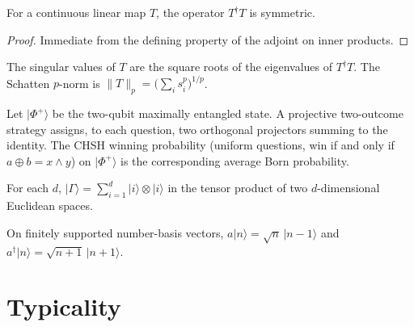 \begin{lemma}
  \label{lem:isSymmetric_adjoint_comp_self}
  \leanok
  For a continuous linear map $T$, the operator $T^\dagger T$ is symmetric.
\end{lemma}

\begin{proof}
  \leanok
  Immediate from the defining property of the adjoint on inner products.
\end{proof}

\begin{definition}
  \label{def:schattenNorm}
  The singular values of $T$ are the square roots of the eigenvalues of
  $T^\dagger T$. The Schatten $p$-norm is $\lVert T\rVert_p = \bigl(\sum_i s_i^p\bigr)^{1/p}$.
\end{definition}

\begin{definition}
  \label{def:chsh}
  Let $\lvert\Phi^+\rangle$ be the two-qubit maximally entangled state.
  A projective two-outcome strategy assigns, to each question, two orthogonal
  projectors summing to the identity. The CHSH winning probability (uniform
  questions, win if and only if $a\oplus b = x\land y$) on $\lvert\Phi^+\rangle$
  is the corresponding average Born probability.
\end{definition}

\begin{definition}
  \label{def:maxEnt}
  For each $d$, $\lvert\Gamma\rangle = \sum_{i=1}^d \lvert i\rangle\otimes\lvert i\rangle$
  in the tensor product of two $d$-dimensional Euclidean spaces.
\end{definition}

\begin{definition}
  \label{def:ccrOps}
  On finitely supported number-basis vectors,
  $a\lvert n\rangle = \sqrt{n}\,\lvert n-1\rangle$ and
  $a^\dagger\lvert n\rangle = \sqrt{n+1}\,\lvert n+1\rangle$.
\end{definition}

\chapter{Typicality}

